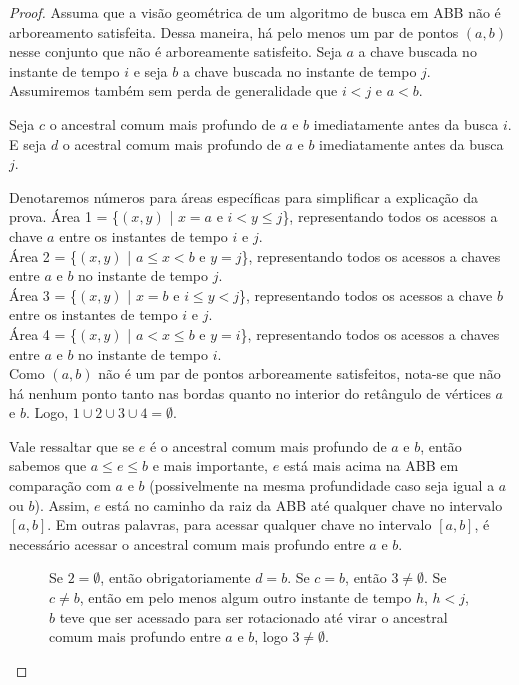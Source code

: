 \begin{proof}
Assuma que a visão geométrica de um algoritmo de busca em ABB não é arboreamento satisfeita. Dessa maneira, há pelo menos um par de pontos $(a,b)$ nesse conjunto que não é arboreamente satisfeito. Seja $a$ a chave buscada no instante de tempo $i$ e seja $b$ a chave buscada no instante de tempo $j$. Assumiremos também sem perda de generalidade que $i < j$ e $a < b$.

Seja $c$ o ancestral comum mais profundo de $a$ e $b$ imediatamente antes da busca $i$. E seja $d$ o acestral comum mais profundo de $a$ e $b$ imediatamente antes da busca $j$.

Denotaremos números para áreas específicas para simplificar a explicação da prova. 
Área 1 = \{$(x,y)$ | $x = a$ e $i < y \leq j$\}, representando todos os acessos a chave $a$ entre os instantes de tempo $i$ e $j$. \\
Área 2 = \{$(x,y)$ | $a \leq x < b$ e $y = j$\}, representando todos os acessos a chaves entre $a$ e $b$ no instante de tempo $j$. \\
Área 3 = \{$(x,y)$ | $x = b$ e $i \leq y < j$\}, representando todos os acessos a chave $b$ entre os instantes de tempo $i$ e $j$. \\
Área 4 = \{$(x,y)$ | $a < x \leq b$ e $y = i$\}, representando todos os acessos a chaves entre $a$ e $b$ no instante de tempo $i$. \\

Como $(a,b)$ não é um par de pontos arboreamente satisfeitos, nota-se que não há nenhum ponto tanto nas bordas quanto no interior do retângulo de vértices $a$ e $b$. Logo, $1 \cup 2 \cup 3 \cup 4 = \emptyset$.

Vale ressaltar que se $e$ é o ancestral comum mais profundo de $a$ e $b$, então sabemos que $a \leq e \leq b$ e mais importante, $e$ está mais acima na ABB em comparação com $a$ e $b$ (possivelmente na mesma profundidade caso seja igual a $a$ ou $b$). Assim, $e$ está no caminho da raiz da ABB até qualquer chave no intervalo $[a,b]$. Em outras palavras, para acessar qualquer chave no intervalo $[a,b]$, é necessário acessar o ancestral comum mais profundo entre $a$ e $b$.

\begin{figure}[H]
    \centering
    \vfill %
    \begin{minipage}[t]{0.6\textwidth}
        Se $2 = \emptyset$, então obrigatoriamente $d = b$. Se $c = b$, então $3 \neq \emptyset$. Se $c \neq b$, então em pelo menos algum outro instante de tempo $h$, $h < j$, $b$ teve que ser acessado para ser rotacionado até virar o ancestral comum mais profundo entre $a$ e $b$, logo $3 \neq \emptyset$.   


\end{minipage}
\end{figure}
\end{proof}
